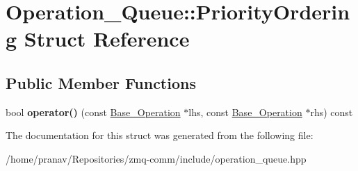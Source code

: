 \hypertarget{structOperation__Queue_1_1PriorityOrdering}{}\section{Operation\+\_\+\+Queue\+:\+:Priority\+Ordering Struct Reference}
\label{structOperation__Queue_1_1PriorityOrdering}
\subsection*{Public Member Functions}
\begin{DoxyCompactItemize}
\item 
bool {\bfseries operator()} (const \hyperlink{classBase__Operation}{Base\+\_\+\+Operation} $\ast$lhs, const \hyperlink{classBase__Operation}{Base\+\_\+\+Operation} $\ast$rhs) const \hypertarget{structOperation__Queue_1_1PriorityOrdering_a5f707bcd126c09e2c68ac7c79fed3ffd}{}\label{structOperation__Queue_1_1PriorityOrdering_a5f707bcd126c09e2c68ac7c79fed3ffd}

\end{DoxyCompactItemize}


The documentation for this struct was generated from the following file\+:\begin{DoxyCompactItemize}
\item 
/home/pranav/\+Repositories/zmq-\/comm/include/operation\+\_\+queue.\+hpp\end{DoxyCompactItemize}
